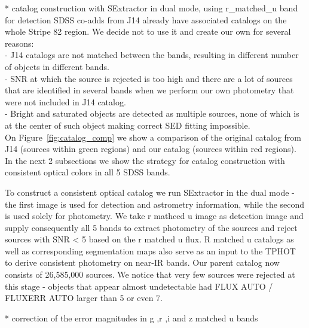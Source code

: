 \documentclass[numberedappendix,apj,twocolumn]{emulateapj}
\begin{document}
 *	catalog construction with SExtractor in dual mode, using r\_matched\_u band for detection
	SDSS co-adds from J14 already have associated catalogs on the whole Stripe 82 region. We decide not to use it and create our own for several reasons:\\
	-	J14 catalogs are not matched between the bands, resulting in different number of objects in different bands.\\
	-	SNR at which the source is rejected is too high and there are a lot of sources that are identified in several bands when we perform our own photometry that were not included in J14 catalog.\\
	-	Bright and saturated objects are detected as multiple sources, none of which is at the center of such object making correct SED fitting impossible. \\
	On Figure~\ref{fig:catalog_comp} we show a comparison of the original catalog from J14 (sources within green regions) and our catalog (sources within red regions). In the next 2 subsections we show the strategy for catalog construction with consistent optical colors in all 5 SDSS bands.

To construct a consistent optical catalog we run SExtractor in the dual mode - the first image is used for detection and astrometry information, while the second is used solely for photometry. We take r mathced u image as detection image and supply consequently all 5 bands to extract photometry of the sources and reject sources with SNR < 5 based on the r matched u flux. R matched u catalogs as well as corresponding segmentation maps also serve as an input to the TPHOT to derive consistent photometry on near-IR bands. Our parent catalog now consists of 26,585,000 sources. We notice that very few sources were
rejected at this stage - objects that appear almost undetectable had FLUX AUTO / FLUXERR AUTO larger than 5 or even 7. 

 *	correction of the error magnitudes in g ,r ,i  and z matched u bands
\end{document}
